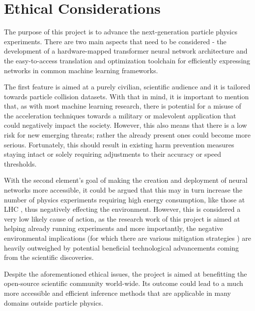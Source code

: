 \section{Ethical Considerations}\label{ethical}

The purpose of this project is to advance the next-generation particle physics experiments. There are two main aspects that need to be considered - the development of a hardware-mapped transformer neural network architecture and the easy-to-access translation and optimization toolchain for efficiently expressing networks in common machine learning frameworks.  

The first feature is aimed at a purely civilian, scientific audience and it is tailored towards particle collision datasets. With that in mind, it is important to mention that, as with most machine learning research, there is potential for a misuse of the acceleration techniques towards a military or malevolent application that could negatively impact the society. However, this also means that there is a low risk for new emerging threats; rather the already present ones could become more serious. Fortunately, this should result in existing harm prevention measures staying intact or solely requiring adjustments to their accuracy or speed thresholds.

With the second element's goal of making the creation and deployment of neural networks more accessible, it could be argued that this may in turn increase the number of physics experiments requiring high energy consumption, like those at LHC \cite{1-cernfacts}, thus negatively effecting the environment. However, this is considered a very low likely cause of action, as the research work of this project is aimed at helping already running experiments and more importantly, the negative environmental implications (for which there are various mitigation strategies \cite{Guida_2016, 2-capeans2017strategies}) are heavily outweighed by potential beneficial technological advancements coming from the scientific discoveries.

Despite the aforementioned ethical issues, the project is aimed at benefitting the open-source scientific community world-wide. Its outcome could lead to a much more accessible and efficient inference methods that are applicable in many domains outside particle physics.

% 